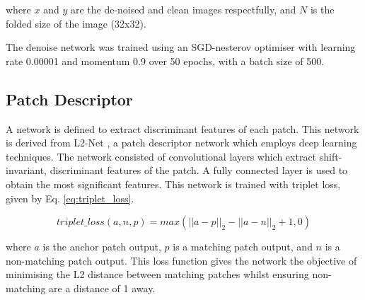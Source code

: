 \documentclass[10pt,twocolumn,letterpaper]{article}
\begin{document}

where $x$ and $y$ are the de-noised and clean images respectfully, and $N$ is the folded size of the image (32x32).

The denoise network was trained using an SGD-nesterov optimiser with learning rate 0.00001 and momentum 0.9 over 50 epochs, with a batch size of 500.


\subsection{Patch Descriptor}

A network is defined to extract discriminant features of each patch. This network is derived from L2-Net \cite{8100132}, a patch descriptor network which employs deep learning techniques.
The network consisted of convolutional layers which extract shift-invariant, discriminant features of the patch. A fully connected layer is used to obtain the most significant features. This network is trained with triplet loss, given by Eq. \ref{eq:triplet_loss}.  

\vspace{-0.2cm}
\begin{equation}
    triplet\_loss(a,n,p) = max(|| a - p ||_2 - || a - n ||_2 + 1,0)
    \label{eq:triplet_loss}
\end{equation}
\vspace{-0.2cm}

where $a$ is the anchor patch output, $p$ is a matching patch output, and $n$ is a non-matching patch output. This loss function gives the network the objective of minimising the L2 distance between matching patches whilst ensuring non-matching are a distance of 1 away.
\end{document}
